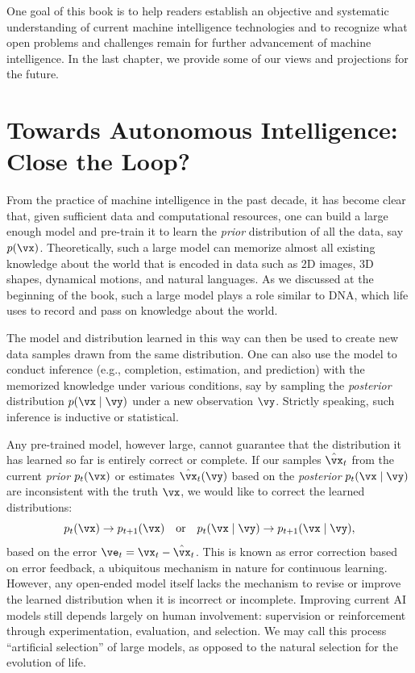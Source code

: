 \documentclass[../../book-main.tex]{subfiles}
\begin{document}
One goal of this book is to help readers establish an objective and
systematic understanding of current machine intelligence technologies
and to recognize what open problems and challenges remain for further
advancement of machine intelligence. In the last chapter, we provide
some of our views and projections for the future.

\section{Towards Autonomous Intelligence: Close the Loop?}
From the practice of machine intelligence in the past decade, it has
become clear that, given sufficient data and computational resources,
one can build a large enough model and pre-train it to learn the
\textit{prior} distribution of all the data, say \(p(\vx)\).
Theoretically, such a large model can memorize almost all existing
knowledge about the world that is encoded in data such as 2D images,
3D shapes, dynamical motions, and natural languages. As we discussed
at the beginning of the book, such a large model plays a role similar
to DNA, which life uses to record and pass on knowledge about the world.

The model and distribution learned in this way can then be used to
create new data samples drawn from the same distribution. One can
also use the model to conduct inference (e.g., completion,
estimation, and prediction) with the memorized knowledge under
various conditions, say by sampling the \textit{posterior}
distribution \(p(\vx\mid \vy)\) under a new observation \(\vy\).
Strictly speaking, such inference is inductive or statistical.

Any pre-trained model, however large, cannot guarantee that the
distribution it has learned so far is entirely correct or complete.
If our samples \(\hat{\vx}_{t}\) from the current \textit{prior}
\(p_{t}(\vx)\) or estimates \(\hat{\vx}_{t}(\vy)\) based on the
\textit{posterior} \(p_{t}(\vx\mid \vy)\) are inconsistent with the
truth \(\vx\), we would like to correct the learned distributions:
\begin{equation}
    p_{t}(\vx) \rightarrow p_{t+1}(\vx) \quad \text{or}\quad
    p_{t}(\vx\mid \vy) \rightarrow p_{t+1}(\vx\mid \vy),
\end{equation}
based on the error \(\ve_{t} = \vx_{t} - \hat{\vx}_{t}\). This is
known as error correction based on error feedback, a ubiquitous
mechanism in nature for continuous learning. However, any open-ended
model itself lacks the mechanism to revise or improve the learned
distribution when it is incorrect or incomplete. Improving current AI
models still depends largely on human involvement: supervision or
reinforcement through experimentation, evaluation, and selection. We
may call this process ``artificial selection'' of large models, as
opposed to the natural selection for the evolution of life.
\end{document}
